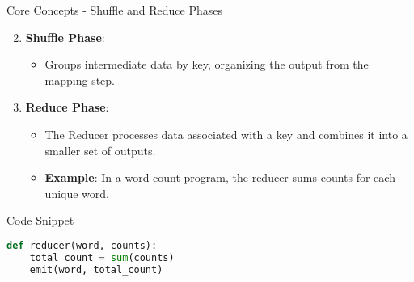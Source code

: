 \documentclass[aspectratio=169]{beamer}
\begin{document}
\begin{frame}{Core Concepts - Shuffle and Reduce Phases}
    \begin{enumerate}
        \setcounter{enumi}{1}
        \item \textbf{Shuffle Phase}:
        \begin{itemize}
            \item Groups intermediate data by key, organizing the output from the mapping step.
        \end{itemize}
        
        \item \textbf{Reduce Phase}:
        \begin{itemize}
            \item The Reducer processes data associated with a key and combines it into a smaller set of outputs.
            \item \textbf{Example}: In a word count program, the reducer sums counts for each unique word.
        \end{itemize}
    \end{enumerate}

    \begin{block}{Code Snippet}
        \begin{lstlisting}[language=Python]
def reducer(word, counts):
    total_count = sum(counts)
    emit(word, total_count)
        \end{lstlisting}
    \end{block}
\end{frame}
\end{document}
